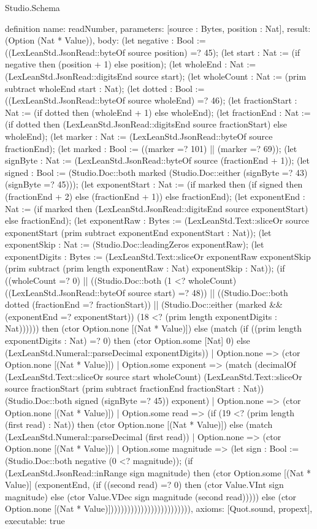 \begin{lexlean}{Studio.Schema}
\begin{semanticmodule}
definition{
  name: readNumber,
  parameters: [source : Bytes, position : Nat],
  result: (Option (Nat * Value)),
  body: (let negative : Bool := ((LexLeanStd.JsonRead::byteOf source position) =? 45); (let start : Nat := (if negative then (position + 1) else position); (let wholeEnd : Nat := (LexLeanStd.JsonRead::digitsEnd source start); (let wholeCount : Nat := (prim subtract wholeEnd start : Nat); (let dotted : Bool := ((LexLeanStd.JsonRead::byteOf source wholeEnd) =? 46); (let fractionStart : Nat := (if dotted then (wholeEnd + 1) else wholeEnd); (let fractionEnd : Nat := (if dotted then (LexLeanStd.JsonRead::digitsEnd source fractionStart) else wholeEnd); (let marker : Nat := (LexLeanStd.JsonRead::byteOf source fractionEnd); (let marked : Bool := ((marker =? 101) || (marker =? 69)); (let signByte : Nat := (LexLeanStd.JsonRead::byteOf source (fractionEnd + 1)); (let signed : Bool := (Studio.Doc::both marked (Studio.Doc::either (signByte =? 43) (signByte =? 45))); (let exponentStart : Nat := (if marked then (if signed then (fractionEnd + 2) else (fractionEnd + 1)) else fractionEnd); (let exponentEnd : Nat := (if marked then (LexLeanStd.JsonRead::digitsEnd source exponentStart) else fractionEnd); (let exponentRaw : Bytes := (LexLeanStd.Text::sliceOr source exponentStart (prim subtract exponentEnd exponentStart : Nat)); (let exponentSkip : Nat := (Studio.Doc::leadingZeros exponentRaw); (let exponentDigits : Bytes := (LexLeanStd.Text::sliceOr exponentRaw exponentSkip (prim subtract (prim length exponentRaw : Nat) exponentSkip : Nat)); (if ((wholeCount =? 0) || ((Studio.Doc::both (1 <? wholeCount) ((LexLeanStd.JsonRead::byteOf source start) =? 48)) || ((Studio.Doc::both dotted (fractionEnd =? fractionStart)) || (Studio.Doc::either (marked && (exponentEnd =? exponentStart)) (18 <? (prim length exponentDigits : Nat)))))) then (ctor Option.none [(Nat * Value)]) else (match (if ((prim length exponentDigits : Nat) =? 0) then (ctor Option.some [Nat] 0) else (LexLeanStd.Numeral::parseDecimal exponentDigits))
    | Option.none => (ctor Option.none [(Nat * Value)])
    | Option.some exponent => (match (decimalOf (LexLeanStd.Text::sliceOr source start wholeCount) (LexLeanStd.Text::sliceOr source fractionStart (prim subtract fractionEnd fractionStart : Nat)) (Studio.Doc::both signed (signByte =? 45)) exponent)
      | Option.none => (ctor Option.none [(Nat * Value)])
      | Option.some read => (if (19 <? (prim length (first read) : Nat)) then (ctor Option.none [(Nat * Value)]) else (match (LexLeanStd.Numeral::parseDecimal (first read))
        | Option.none => (ctor Option.none [(Nat * Value)])
        | Option.some magnitude => (let sign : Bool := (Studio.Doc::both negative (0 <? magnitude)); (if (LexLeanStd.JsonRead::inRange sign magnitude) then (ctor Option.some [(Nat * Value)] (exponentEnd, (if ((second read) =? 0) then (ctor Value.VInt sign magnitude) else (ctor Value.VDec sign magnitude (second read))))) else (ctor Option.none [(Nat * Value)])))))))))))))))))))))))),
  axioms: [Quot.sound, propext],
  executable: true
}


\end{semanticmodule}
\end{lexlean}
